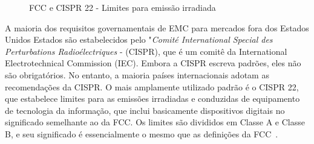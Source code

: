 \begin{figure}[htb!]
	\centering
 	\caption{FCC e CISPR 22 - Limites para emissão irradiada}
 	\label{fig:irradiada_limites}
\end{figure}

A maioria dos requisitos governamentais de EMC para mercados fora dos Estados Unidos Estados são estabelecidos pelo "\textit{Comité International Special des Perturbations Radioélectriques} - (CISPR), que é um comitê da International Electrotechnical Commission (IEC). Embora a CISPR escreva padrões, eles não são obrigatórios. No entanto, a maioria países internacionais adotam as recomendações da CISPR. O mais amplamente utilizado padrão é o CISPR 22, que estabelece limites para as emissões irradiadas e conduzidas de equipamento de tecnologia da informação, que inclui basicamente dispositivos digitais
no significado semelhante ao da FCC. Os limites são divididos em Classe A e Classe B, e seu significado é essencialmente o mesmo que as definições da FCC~\cite[p.~55]{paul2006}.

